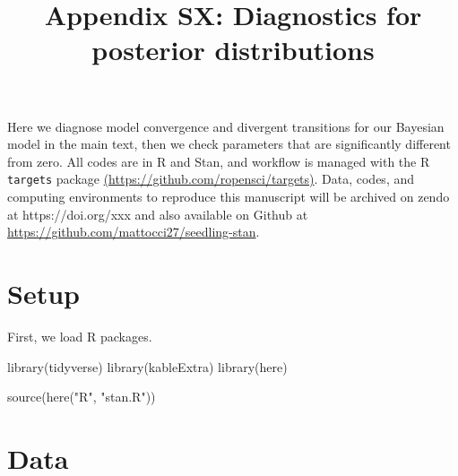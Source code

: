 \documentclass[
  11pt,
  letterpaper,
  DIV=11,
  numbers=noendperiod]{scrartcl}
\title{Appendix SX: Diagnostics for posterior distributions}
\author{}
\date{}
\newenvironment{Shaded}{}{}
\newcommand{\FunctionTok}[1]{\textcolor[rgb]{0.44,0.26,0.76}{#1}}
\newcommand{\NormalTok}[1]{\textcolor[rgb]{0.14,0.16,0.18}{#1}}
\newcommand{\StringTok}[1]{\textcolor[rgb]{0.01,0.18,0.38}{#1}}
\renewcommand*\contentsname{Table of contents}
\newcommand\contentsname{Table of contents}
\begin{document}
\maketitle
\ifdefined\Shaded\renewenvironment{Shaded}{\begin{tcolorbox}[breakable, boxrule=0pt, borderline west={3pt}{0pt}{shadecolor}, frame hidden, sharp corners, interior hidden, enhanced]}{\end{tcolorbox}}\fi

\renewcommand*\contentsname{Table of contents}
{
\hypersetup{linkcolor=}
\setcounter{tocdepth}{3}
\tableofcontents
}
\newpage

Here we diagnose model convergence and divergent transitions for our
Bayesian model in the main text, then we check parameters that are
significantly different from zero. All codes are in R and Stan, and
workflow is managed with the R \texttt{targets} package
\href{https://github.com/ropensci/targets}{(https://github.com/ropensci/targets)}.
Data, codes, and computing environments to reproduce this manuscript
will be archived on zendo at https://doi.org/xxx and also available on
Github at \url{https://github.com/mattocci27/seedling-stan}.

\hypertarget{setup}{%
\section{Setup}\label{setup}}

First, we load R packages.

\begin{Shaded}
\begin{Highlighting}[]
\FunctionTok{library}\NormalTok{(tidyverse)}
\FunctionTok{library}\NormalTok{(kableExtra)}
\FunctionTok{library}\NormalTok{(here)}
\end{Highlighting}
\end{Shaded}

\begin{Shaded}
\begin{Highlighting}[]
\FunctionTok{source}\NormalTok{(}\FunctionTok{here}\NormalTok{(}\StringTok{"R"}\NormalTok{, }\StringTok{"stan.R"}\NormalTok{))}
\end{Highlighting}
\end{Shaded}

\hypertarget{data}{%
\section{Data}\label{data}}
\end{document}
